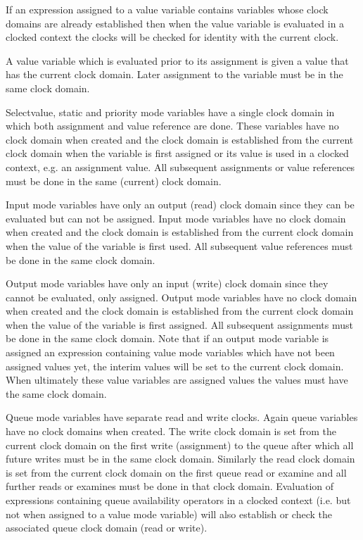             If an expression assigned to a value variable contains variables
            whose clock domains are already established then when the value
            variable is evaluated in a clocked context the clocks will be
            checked for identity with the current clock.
            
            A value variable which is evaluated prior to its assignment is given a
            value that has the current clock domain. Later assignment to the
            variable must be in the same clock domain.

            Selectvalue, static and priority mode variables have a single clock
            domain in which both assignment and value reference are done. These
            variables have no clock domain when created and the clock domain is
            established from the current clock domain when the variable is first
            assigned or its value is used in a clocked context, e.g. an assignment
            value. All subsequent assignments or value references must be done in
            the same (current) clock domain.
            
            Input mode variables have only an output (read) clock domain since they
            can be evaluated but can not be assigned. Input mode variables have no
            clock domain when created and the clock domain is established from the
            current clock domain when the value of the variable is first used. All
            subsequent value references must be done in the same clock domain.
            
            Output mode variables have only an input (write) clock domain since they
            cannot be evaluated, only assigned. Output mode variables have no clock
            domain when created and the clock domain is established from the current
            clock domain when the value of the variable is first assigned. All
            subsequent assignments must be done in the same clock domain.        
            Note that if an output mode variable is assigned an expression
            containing value mode variables which have not been assigned values yet,
            the interim values will be set to the current clock domain. When
            ultimately these value variables are assigned values the values must
            have the same clock domain.
 
            Queue mode variables have separate read and write clocks. Again queue
            variables have no clock domains when created. The write clock
            domain is set from the current clock domain on the first write
            (assignment) to the queue after which all future writes must be in
            the same clock domain. Similarly the read clock domain is set from
            the current clock domain on the first queue read or examine and all
            further reads or examines must be done in that clock domain. Evaluation
            of expressions containing queue availability operators in a clocked
            context (i.e. but not when assigned to a value mode variable) will
            also establish or check the associated queue clock domain (read or write).
            
